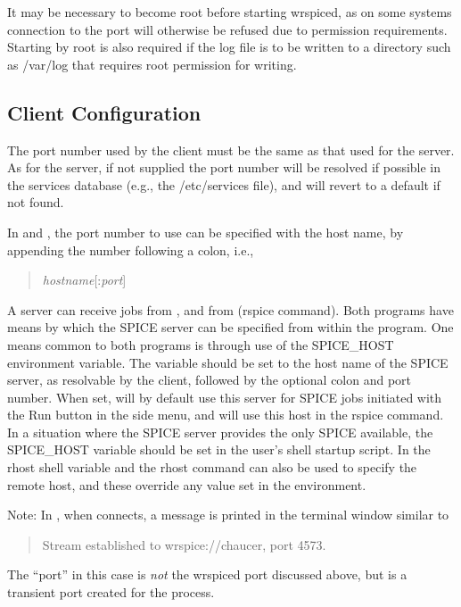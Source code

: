 It may be necessary to become root before starting {\vt wrspiced}, as
on some systems connection to the port will otherwise be refused due
to permission requirements.  Starting by root is also required if the
log file is to be written to a directory such as {\vt /var/log} that
requires root permission for writing.

\subsection{Client Configuration}

The port number used by the client must be the same as that used for
the server.  As for the server, if not supplied the port number will
be resolved if possible in the services database (e.g., the {\vt
/etc/services} file), and will revert to a default if not found.

In {\Xic} and {\WRspice}, the port number to use can be specified with
the host name, by appending the number following a colon, i.e.,
\begin{quote}
{\it hostname\/}[:{\it port\/}]
\end{quote}

A {\WRspice} server can receive jobs from {\Xic}, and from {\WRspice}
({\cb rspice} command).  Both programs have means by which the SPICE
server can be specified from within the program.  One means common to
both programs is through use of the {\et SPICE\_HOST} environment
variable.  The variable should be set to the host name of the SPICE
server, as resolvable by the client, followed by the optional colon
and port number.  When set, {\Xic} will by default use this server for
SPICE jobs initiated with the {\cb Run} button in the side menu, and
{\WRspice} will use this host in the {\et rspice} command.  In a
situation where the SPICE server provides the only SPICE available,
the {\et SPICE\_HOST} variable should be set in the user's shell
startup script.  In {\WRspice} the {\et rhost} shell variable and the
{\cb rhost} command can also be used to specify the remote host, and
these override any value set in the environment.

Note:  In {\Xic}, when {\WRspice} connects, a message is printed in
the terminal window similar to
\begin{quote}
{\vt Stream established to wrspice://chaucer, port 4573.}
\end{quote}
The ``port'' in this case is {\it not} the {\vt wrspiced} port
discussed above, but is a transient port created for the process.


